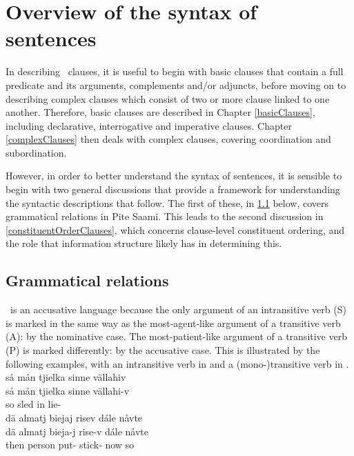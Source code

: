 


\chapter{Overview of the syntax of sentences}\label{overviewSyntax}
In describing \PS\ clauses, it is useful to begin with basic clauses that contain a full predicate and its arguments, complements and/or adjuncts, before moving on to describing complex clauses which consist of two or more clause linked to one another. 
Therefore, basic clauses are described in Chapter \ref{basicClauses}, including declarative, interrogative and imperative clauses. Chapter \ref{complexClauses} then deals with complex clauses, covering coordination and subordination. 

However, in order to better understand the syntax of sentences, it is sensible to begin with two general discussions that provide a framework for understanding the syntactic descriptions that follow. The first of these, in \SEC\ref{grammaticalRelations} below, covers grammatical relations in Pite Saami. This leads to the second discussion in \SEC\ref{constituentOrderClauses}, which concerns clause-level constituent ordering, and the role that information structure likely has in determining this.


\section{Grammatical relations}\label{grammaticalRelations}
\PS\ is an accusative language because %
the only argument of an intransitive verb (S) is marked in the same way as the most-agent-like argument of a transitive verb (A): by the nominative case. 
The most-patient-like argument of a transitive verb (P) is marked differently: by the accusative case. This is illustrated by the following examples, with an intransitive verb in  and a (mono-)transitive verb in .
\ea\label{intrans1}
\glll	så mån tjielka sinne vällahiv\\
	så mån tjielka sinne vällahi-v\\
	so  sled\BS{} in lie-\\\nopagebreak
{} 
\z
\ea\label{monotrans1}
\glll	dä almatj biejaj risev dále nåvte\\
	dä almatj bieja-j rise-v dále nåvte\\
	then person\BS{} put- stick- now so\\\nopagebreak
{} 
\z

